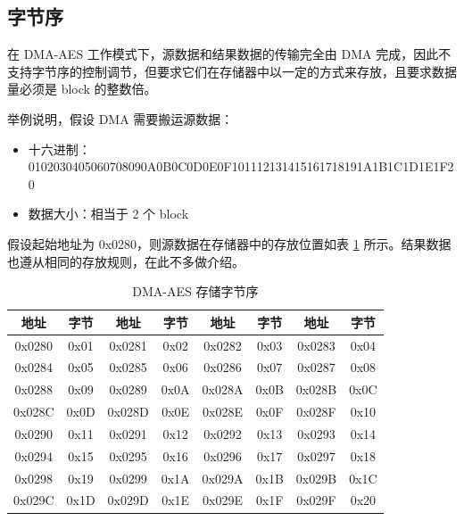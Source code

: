 \documentclass[main\_\_CN.tex]{subfiles}
\begin{document}
    
\subsection{字节序}

在 DMA-AES 工作模式下，源数据和结果数据的传输完全由 DMA 完成，因此不支持字节序的控制调节，但要求它们在存储器中以一定的方式来存放，且要求数据量必须是 block 的整数倍。

举例说明，假设 DMA 需要搬运源数据：

\begin{itemize}
    \item 十六进制： 0102030405060708090A0B0C0D0E0F101112131415161718191A1B1C1D1E1F20
    \item 数据大小：相当于 2 个 block
\end{itemize}

假设起始地址为 0x0280，则源数据在存储器中的存放位置如表 \ref{tab:aes-dma-aes-plaintext-ciphertext-endian} 所示。结果数据也遵从相同的存放规则，在此不多做介绍。

\begin{longtable}[c]
{ |c|c|c|c|c|c|c|c|}
\caption{DMA-AES 存储字节序} 
\label{tab:aes-dma-aes-plaintext-ciphertext-endian}\\
\hline 
\rowcolor{lightgray}
\textbf{地址} &  \textbf{字节}  & \textbf{地址} &  \textbf{字节}  & \textbf{地址} &  \textbf{字节}  & \textbf{地址} &  \textbf{字节} \\\hline
0x0280 & 0x01 & 0x0281 & 0x02 & 0x0282 & 0x03 & 0x0283 & 0x04 \\\hline 
0x0284 & 0x05 & 0x0285 & 0x06 & 0x0286 & 0x07 & 0x0287 & 0x08 \\\hline 
0x0288 & 0x09 & 0x0289 & 0x0A & 0x028A & 0x0B & 0x028B & 0x0C \\\hline 
0x028C & 0x0D & 0x028D & 0x0E & 0x028E & 0x0F & 0x028F & 0x10 \\\hline 
0x0290 & 0x11 & 0x0291 & 0x12 & 0x0292 & 0x13 & 0x0293 & 0x14 \\\hline 
0x0294 & 0x15 & 0x0295 & 0x16 & 0x0296 & 0x17 & 0x0297 & 0x18 \\\hline 
0x0298 & 0x19 & 0x0299 & 0x1A & 0x029A & 0x1B & 0x029B & 0x1C \\\hline 
0x029C & 0x1D & 0x029D & 0x1E & 0x029E & 0x1F & 0x029F & 0x20 \\\hline  
\end{longtable}

\end{document}
